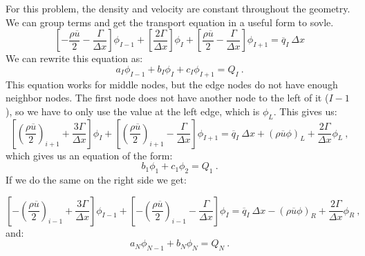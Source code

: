 \documentclass[12pt]{article}
\begin{document}
For this problem, the density and velocity are constant throughout the geometry. We can group terms and get the transport equation in a useful form to sovle.
\begin{equation}
    \left[ -\frac{\rho \overline{u}}{2} - \frac{\Gamma}{\Delta x} \right] \phi_{I-1} + \left[ \frac{2\Gamma}{\Delta x} \right] \phi_{I} + \left[ \frac{\rho \overline{u}}{2} - \frac{\Gamma}{\Delta x} \right] \phi_{I+1} = \overline{q}_{I}\: \Delta x
    \label{eq:grouped}
\end{equation}
We can rewrite this equation as:
\begin{equation}
    a_{I}\phi_{I-1} + b_{I}\phi_{I} + c_{I}\phi_{I+1} = Q_{I}\:.
    \label{eq:coef}
\end{equation}
This equation works for middle nodes, but the edge nodes do not have enough neighbor nodes. The first node does not have another node to the left of it ($I-1$), so we have to only use the value at the left edge, which is $\phi_{L}$. This gives us:
\begin{equation}
    \left[ \left( \frac{\rho \overline{u}}{2} \right)_{i+1} + \frac{3 \Gamma}{\Delta x} \right]\phi_{I} + \left[ \left( \frac{\rho \overline{u}}{2} \right)_{i+1} - \frac{\Gamma}{\Delta x} \right]\phi_{I+1} = \overline{q}_{I}\: \Delta x + \left( \rho \overline{u} \phi \right)_{L} + \frac{2\Gamma}{\Delta x}\phi_L\:,
    \label{eq:node 1 grouped}
\end{equation}
which gives us an equation of the form:
\begin{equation}
    b_1 \phi_1 + c_1 \phi_2 = Q_1\:.
    \label{eq:node 1 coef}
\end{equation}
If we do the same on the right side we get:

\begin{equation}
    \left[ -\left( \frac{\rho \overline{u}}{2} \right)_{i-1} + \frac{3 \Gamma}{\Delta x} \right]\phi_{I-1} + \left[ -\left( \frac{\rho \overline{u}}{2} \right)_{i-1} - \frac{\Gamma}{\Delta x} \right]\phi_{I} = \overline{q}_{I}\: \Delta x - \left( \rho \overline{u} \phi \right)_{R} + \frac{2\Gamma}{\Delta x}\phi_R\:,
    \label{eq:node N grouped}
\end{equation}
and:
\begin{equation}
    a_N \phi_{N-1} + b_{N} \phi_N = Q_N\:.
    \label{eq:node N coef}
\end{equation}


\end{document}
